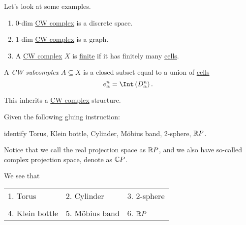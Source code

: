 \begin{eg}
	Let's look at some examples.
	\begin{enumerate}[(1)]
		\item \(0\)-dim \hyperref[def:CW-Complex]{CW complex} is a discrete space.
		\item \(1\)-dim \hyperref[def:CW-Complex]{CW complex} is a graph.
		\item A \hyperref[def:CW-Complex]{CW complex} \(X\) is \underline{finite} if it has finitely many \hyperref[def:cell]{cells}.
	\end{enumerate}
\end{eg}

\begin{definition}[CW subcomplex]\label{def:CW-subcomplex}
	A \emph{CW subcomplex} \(A\subseteq X\) is a closed subset equal to a union of \hyperref[def:cell]{cells}
	\[
		e^n_{\alpha} = \Int \left(D^n_{\alpha}\right).
	\]
\end{definition}
\begin{remark}
	This inherits a \hyperref[def:CW-Complex]{CW complex} structure.
\end{remark}

\begin{exercise}
	Given the following gluing instruction:
	\begin{center}
	\end{center}
	identify Torus, Klein bottle, Cylinder, Möbius band, 2-sphere, \(\mathbb{\MakeUppercase{R}} P\).
	\begin{notation}
		Notice that we call the real projection space as \(\mathbb{\MakeUppercase{R}} P\), and we also have so-called
		complex projection space, denote as \(\mathbb{\MakeUppercase{C}} P\).
	\end{notation}
\end{exercise}
\begin{answer}
	We see that
	\begin{table}[H]
		\centering
		\begin{tabular}{lll}
			1. Torus        & 2. Cylinder    & 3. 2-sphere                                 \\\\
			4. Klein bottle & 5. Möbius band & 6.         \(\mathbb{\MakeUppercase{R}} P\) \\
		\end{tabular}
	\end{table}
\end{answer}

